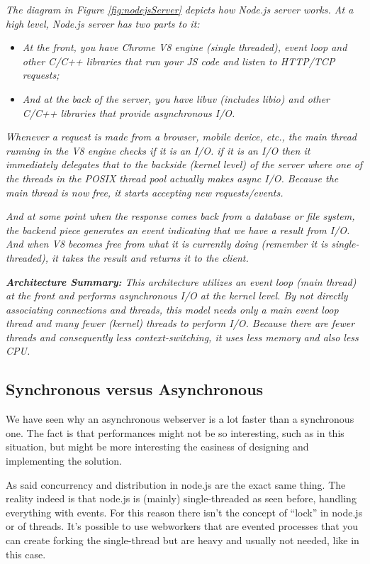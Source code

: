 \textit{The diagram in Figure \ref{fig:nodejsServer} depicts how Node.js server works. At a high level, Node.js server has two parts to it:}
\begin{itemize}
\item \textit{At the front, you have Chrome V8 engine (single threaded), event loop and other C/C++ libraries that run your JS code and listen to HTTP/TCP requests;}
\item \textit{And at the back of the server, you have libuv (includes libio) and other C/C++ libraries that provide asynchronous I/O.}
\end{itemize}

\textit{Whenever a request is made from a browser, mobile device, etc., the main thread running in the V8 engine checks if it is an I/O. if it is an I/O then it immediately delegates that to the backside (kernel level) of the server where one of the threads in the POSIX thread pool actually makes async I/O. Because the main thread is now free, it starts accepting new requests/events.}

\textit{And at some point when the response comes back from a database or file system, the backend piece generates an event indicating that we have a result from I/O. And when V8 becomes free from what it is currently doing (remember it is single-threaded), it takes the result and returns it to the client.}

\textit{\textbf{Architecture Summary:} This architecture utilizes an event loop (main thread) at the front and performs asynchronous I/O at the kernel level. By not directly associating connections and threads, this model needs only a main event loop thread and many fewer (kernel) threads to perform I/O. Because there are fewer threads and consequently less context-switching, it uses less memory and also less CPU.}

\subsection{Synchronous versus Asynchronous}

We have seen why an asynchronous webserver is a lot faster than a synchronous one. The fact is that performances might not be so interesting, such as in this situation, but might be more interesting the easiness of designing and implementing the solution.

As said concurrency and distribution in node.js are the exact same thing. The reality indeed is that node.js is (mainly) single-threaded as seen before, handling everything with events. For this reason there isn't the concept of ``lock'' in node.js or of threads. It's possible to use webworkers that are evented processes that you can create forking the single-thread but are heavy and usually not needed, like in this case.

